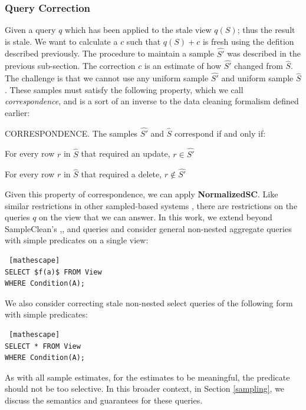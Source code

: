 \subsubsection{Query Correction}
Given a query $q$ which has been applied to the stale view $q(S)$; thus the result is stale.
We want to calculate a $c$ such that $q(S)+c$ is fresh using the defition described previously.
The procedure to maintain a sample $\hat{S'}$ was described in the previous sub-section.
The correction $c$ is an estimate of how $\hat{S'}$ changed from $\hat{S}$.
The challenge is that we cannot use any uniform sample $\hat{S'}$ and uniform sample $\hat{S}$.
These samples must satisfy the following property, which we call \emph{correspondence}, and is a sort of an inverse to the 
data cleaning formalism defined earlier:

\begin{definition} CORRESPONDENCE.
The samples $\hat{S'}$ and $\hat{S}$ correspond if and only if:
\item For every row $r$ in $\hat{S}$ that required an update, $r\in \hat{S'}$
\item For every row $r$ in $\hat{S}$ that required a delete, $r \not\in \hat{S'}$
\end{definition}

Given this property of correspondence, we can apply \textbf{NormalizedSC}.
Like similar restrictions in other sampled-based systems \cite{agarwalknowing}, there are restrictions on the queries $q$ on the view that we can answer.
In this work, we extend beyond SampleClean's \sumfunc,\countfunc, and \avgfunc queries and consider general non-nested aggregate queries with simple predicates on a single view:
\begin{lstlisting} [mathescape]
SELECT $f(a)$ FROM View 
WHERE Condition(A);
\end{lstlisting}
We also consider correcting stale non-nested select queries of the following form with simple predicates:
\begin{lstlisting} [mathescape]
SELECT * FROM View 
WHERE Condition(A);
\end{lstlisting}
As with all sample estimates, for the estimates to be meaningful, the predicate should not be too selective. 
In this broader context, in Section \ref{sampling}, we discuss the semantics and guarantees for these queries.

